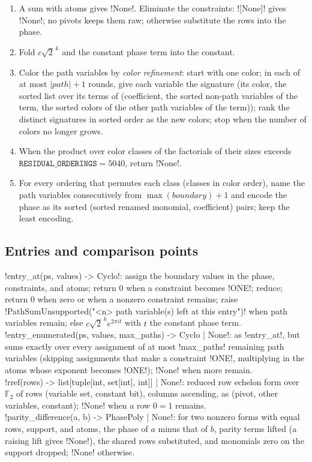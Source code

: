 \begin{algorithm}\label{alg:algebra-residual}
\begin{enumerate}
\item A sum with atoms gives \py!None!. Eliminate the constraints: \py![None]! gives \py!None!; no pivots keeps them raw; otherwise substitute the rows into the phase.
\item Fold $c\sqrt2^{\,k}$ and the constant phase term into the constant.
\item Color the path variables by \emph{color refinement}: start with one color; in each of at most $|\mathit{path}|+1$ rounds, give each variable the signature (its color, the sorted list over its terms of (coefficient, the sorted non-path variables of the term, the sorted colors of the other path variables of the term)); rank the distinct signatures in sorted order as the new colors; stop when the number of colors no longer grows.
\item When the product over color classes of the factorials of their sizes exceeds $\mathtt{RESIDUAL\_ORDERINGS}=5040$, return \py!None!.
\item For every ordering that permutes each class (classes in color order), name the path variables consecutively from $\max(\mathit{boundary})+1$ and encode the phase as its sorted (sorted renamed monomial, coefficient) pairs; keep the least encoding.
\end{enumerate}
\end{algorithm}

\subsection{Entries and comparison points}

\begin{signature}
\py!entry_at(ps, values) -> Cyclo!: assign the boundary values in the phase, constraints, and atoms; return $0$ when a constraint becomes \py!ONE!; reduce; return $0$ when zero or when a nonzero constraint remains; raise \py!PathSumUnsupported("<n> path variable(s) left at this entry")! when path variables remain; else $c\sqrt2^{\,k}e^{2\pi it}$ with $t$ the constant phase term.\\
\py!entry_enumerated(ps, values, max_paths) -> Cyclo | None!: as \py!entry_at!, but sums exactly over every assignment of at most \code!max_paths! remaining path variables (skipping assignments that make a constraint \py!ONE!, multiplying in the atoms whose exponent becomes \py!ONE!); \py!None! when more remain.\\
\py!rref(rows) -> list[tuple[int, set[int], int]] | None!: reduced row echelon form over $\mathbb{F}_2$ of rows (variable set, constant bit), columns ascending, as (pivot, other variables, constant); \py!None! when a row $0=1$ remains.\\
\py!parity_difference(a, b) -> PhasePoly | None!: for two nonzero forms with equal rows, support, and atoms, the phase of $a$ minus that of $b$, parity terms lifted (a raising lift gives \py!None!), the shared rows substituted, and monomials zero on the support dropped; \py!None! otherwise.
\end{signature}

